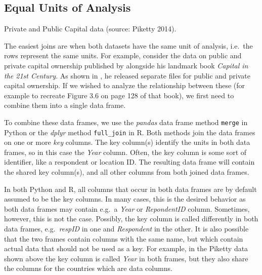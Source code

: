 \subsection{Equal Units of Analysis}\label{sec:equalunits}

\begin{ccsexample}
\caption{Private and Public Capital data (source: Piketty 2014).}\label{ex:piketty}
\end{ccsexample}


The easiest joins are when both datasets have the same unit of analysis,
i.e.\ the rows represent the same units.
For example, consider the data on public and private capital ownership published by
\cite{piketty} alongside his landmark book \emph{Capital in the 21st Century}.
As shown in , he released separate files for public and private capital ownership.
If we wished to analyze the relationship between these (for example to recreate Figure 3.6 on page 128 of that book),
we first need to combine them into a single data frame.

To combine these data frames, we use the \emph{pandas} data frame method \texttt{merge} in Python or the \emph{dplyr} method \texttt{full\_join} in R.
Both methods join the data frames on one or more \emph{key} columns.
The key column(s) identify the units in both data frames, so in this case the \emph{Year} column.
Often, the key column is some sort of identifier, like a respondent or location ID.
The resulting data frame will contain the shared key column(s), and all other columns from both joined data frames.

In both Python and R, all columns that occur in both data frames are by default assumed to be the key columns.
In many cases, this is the desired behavior as both data frames may contain e.g.\ a \emph{Year} or \emph{RepondentID} column.
Sometimes, however, this is not the case.
Possibly, the key column is called differently in both data frames, e.g.\ \emph{respID} in one and \emph{Respondent} in the other.
It is also possible that the two frames contain columns with the same name,
but which contain actual data that should not be used as a key.
For example, in the Piketty data shown above the key column is called \emph{Year} in both frames,
but they also share the columns for the countries which are data columns.

